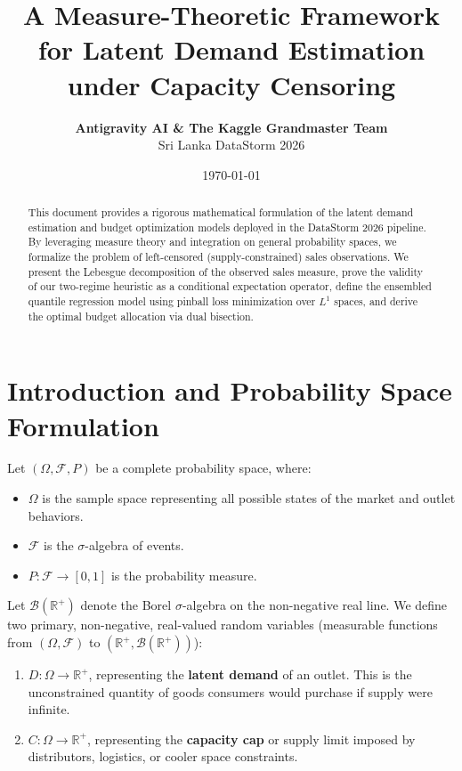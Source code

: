\documentclass[11pt,a4paper]{article}
\title{\textbf{A Measure-Theoretic Framework for Latent Demand Estimation under Capacity Censoring}}
\author{\textbf{Antigravity AI \& The Kaggle Grandmaster Team} \\ Sri Lanka DataStorm 2026}
\date{\today}
\theoremstyle{definition}
\begin{document}
\maketitle

\begin{abstract}
This document provides a rigorous mathematical formulation of the latent demand estimation and budget optimization models deployed in the DataStorm 2026 pipeline. By leveraging measure theory and integration on general probability spaces, we formalize the problem of left-censored (supply-constrained) sales observations. We present the Lebesgue decomposition of the observed sales measure, prove the validity of our two-regime heuristic as a conditional expectation operator, define the ensembled quantile regression model using pinball loss minimization over $L^1$ spaces, and derive the optimal budget allocation via dual bisection.
\end{abstract}

\section{Introduction and Probability Space Formulation}
Let $(\Omega, \mathcal{F}, P)$ be a complete probability space, where:
\begin{itemize}
    \item $\Omega$ is the sample space representing all possible states of the market and outlet behaviors.
    \item $\mathcal{F}$ is the $\sigma$-algebra of events.
    \item $P: \mathcal{F} \to [0,1]$ is the probability measure.
\end{itemize}

Let $\mathcal{B}(\mathbb{R}^+)$ denote the Borel $\sigma$-algebra on the non-negative real line. We define two primary, non-negative, real-valued random variables (measurable functions from $(\Omega, \mathcal{F})$ to $(\mathbb{R}^+, \mathcal{B}(\mathbb{R}^+))$):
\begin{enumerate}
    \item $D: \Omega \to \mathbb{R}^+$, representing the \textbf{latent demand} of an outlet. This is the unconstrained quantity of goods consumers would purchase if supply were infinite.
    \item $C: \Omega \to \mathbb{R}^+$, representing the \textbf{capacity cap} or supply limit imposed by distributors, logistics, or cooler space constraints.
\end{enumerate}
\end{document}
